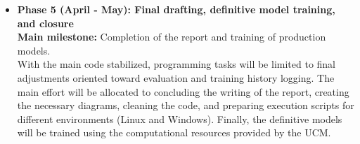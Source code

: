 \begin{itemize}
    \item \textbf{Phase 5 (April - May): Final drafting, definitive model training, and closure} \\
    \textbf{Main milestone:} Completion of the report and training of production models. \\
    With the main code stabilized, programming tasks will be limited to final adjustments oriented toward evaluation and training history logging. The main effort will be allocated to concluding the writing of the report, creating the necessary diagrams, cleaning the code, and preparing execution scripts for different environments (Linux and Windows). Finally, the definitive models will be trained using the computational resources provided by the UCM.
\end{itemize}